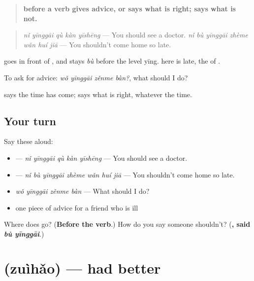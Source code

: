 \begin{grammarlens}[title={Grammar Lens: \zh{应该} and \zh{不应该}, advice and what is right}]
\begin{quote}
\textbf{ before a verb gives advice, or says what is right;  says what is not.}
\end{quote}

\begin{quote}
\textbf{} \emph{nǐ yīnggāi qù kàn yīshēng} — You should see a doctor. \textbf{} \emph{nǐ bù yīnggāi zhème wǎn huí jiā} — You shouldn't come home so late.
\end{quote}

 goes in front of , and stays \emph{bù} before the level yīng.  here is late, the  of .

To ask for advice: \emph{wǒ yīnggāi zěnme bàn?}, what should I do?

 says the time has come;  says what is right, whatever the time.
\end{grammarlens}

\subsection*{Your turn}
Say these aloud:

\begin{itemize}
\raggedright
  \item {} — \emph{nǐ yīnggāi qù kàn yīshēng} — You should see a doctor.
  \item {} — \emph{nǐ bù yīnggāi zhème wǎn huí jiā} — You shouldn't come home so late.
  \item \emph{wǒ yīnggāi zěnme bàn} — What should I do?
  \item one piece of advice for a friend who is ill
\end{itemize}

\begin{tcolorbox}[breakable,colback=teal!4,colframe=teal!35!black,title={Before you move on}]
Where does  go? (\textbf{Before the verb}.) How do you say someone shouldn't? (\textbf{, said \emph{bù yīnggāi}}.)
\end{tcolorbox}
\section[\texorpdfstring{\zh{最好} (zuìhǎo)}{最好 (zuìhǎo)}]{ (zuìhǎo) — had better}

